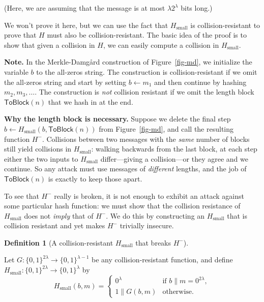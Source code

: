 \documentclass[
  letterpaper,
]{scrbook}
\newcommand{\zo}{\{0,1\}}
\newcommand{\bin}{\zo}
\theoremstyle{definition}
\newtheorem{definition}{Definition}[chapter]
\theoremstyle{plain}
\theoremstyle{plain}
\theoremstyle{remark}
\begin{document}
(Here, we are assuming that the message is at most
\(\lambda 2^{\lambda}\) bits long.)


We won't prove it here, but we can use the fact that \(H_\text{small}\)
is collision-resistant to prove that \(H\) must also be
collision-resistant. The basic idea of the proof is to show that given a
collision in \(H\), we can easily compute a collision in
\(H_{\text{small}}\).

\textbf{Note.} In the Merkle-Damgård construction of
Figure~\ref{fig-md}, we initialize the variable \(b\) to the all-zeros
string. The construction is collision-resistant if we omit the all-zeros
string and start by setting \(b \gets m_1\) and then continue by hashing
\(m_2, m_3, \dots\). The construction is \emph{not} collision resistant
if we omit the length block \(\mathsf{ToBlock}(n)\) that we hash in at
the end.

\textbf{Why the length block is necessary.} Suppose we delete the final
step \(b \gets H_\text{small}(b, \mathsf{ToBlock}(n))\) from
Figure~\ref{fig-md}, and call the resulting function \(H^-\). Collisions
between two messages with the \emph{same} number of blocks still yield
collisions in \(H_\text{small}\): walking backwards from the last block,
at each step either the two inputs to \(H_\text{small}\) differ---giving
a collision---or they agree and we continue. So any attack must use
messages of \emph{different} lengths, and the job of
\(\mathsf{ToBlock}(n)\) is exactly to keep those apart.

To see that \(H^-\) really is broken, it is not enough to exhibit an
attack against some particular hash function: we must show that the
collision resistance of \(H_\text{small}\) does not \emph{imply} that of
\(H^-\). We do this by constructing an \(H_\text{small}\) that is
collision resistant and yet makes \(H^-\) trivially insecure.

\begin{definition}[A collision-resistant \(H_\text{small}\) that breaks
\(H^-\)]\protect\hypertarget{def-md-no-length}{}\label{def-md-no-length}

Let \(G: \bin^{2\lambda} \rightarrow \bin^{\lambda-1}\) be any
collision-resistant function, and define
\(H_\text{small}: \bin^{2\lambda} \rightarrow \bin^{\lambda}\) by \[
H_\text{small}(b, m) =
\begin{cases}
  0^{\lambda} & \text{if } b \| m = 0^{2\lambda},\\
  1 \| G(b, m) & \text{otherwise.}
\end{cases}
\]

\end{definition}
\end{document}
